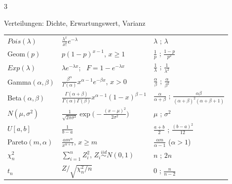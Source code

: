 \documentclass[8pt,a4paper,landscape]{extarticle}
\newcommand{\iid}{\overset{iid}{\sim}}
\begin{document}
\begin{multicols*}{3}
\begin{werkzeug}{Verteilungen: Dichte, Erwartungswert, Varianz}
{\begin{tabularx}{\linewidth}{@{}>{\raggedright\arraybackslash}p{1.75cm}>{\raggedright\arraybackslash}X>{\raggedright\arraybackslash}p{2.75cm}@{}}
$Pois(\lambda)$ & $\frac{\lambda^x}{x!}e^{-\lambda}$ & $\lambda$ ; $\lambda$ \\
Geom$(p)$ & $p(1-p)^{x-1}$, $x\ge 1$ & $\frac1p$ ; $\frac{1-p}{p^2}$ \\
$Exp(\lambda)$ & $\lambda e^{-\lambda x}$; \ $F=1-e^{-\lambda x}$ & $\frac1\lambda$ ; $\frac{1}{\lambda^2}$ \\
Gamma$(\alpha,\beta)$ & $\frac{\beta^\alpha}{\Gamma(\alpha)}x^{\alpha-1}e^{-\beta x}$, $x>0$ & $\frac\alpha\beta$ ; $\frac{\alpha}{\beta^2}$ \\
Beta$(\alpha,\beta)$ & $\frac{\Gamma(\alpha+\beta)}{\Gamma(\alpha)\Gamma(\beta)}x^{\alpha-1}(1-x)^{\beta-1}$ & $\frac{\alpha}{\alpha+\beta}$ ; $\frac{\alpha\beta}{(\alpha+\beta)^2(\alpha+\beta+1)}$ \\
$N(\mu,\sigma^2)$ & $\frac{1}{\sqrt{2\pi\sigma^2}}\exp\!\big(-\frac{(x-\mu)^2}{2\sigma^2}\big)$ & $\mu$ ; $\sigma^2$ \\
$U[a,b]$ & $\frac{1}{b-a}$ & $\frac{a+b}{2}$ ; $\frac{(b-a)^2}{12}$ \\
Pareto$(m,\alpha)$ & $\frac{\alpha m^\alpha}{x^{\alpha+1}}$, $x\ge m$ & $\frac{\alpha m}{\alpha-1}$ ($\alpha>1$) \\
$\chi^2_n$ & $\sum_{i=1}^n Z_i^2$, $Z_i\iid N(0,1)$ & $n$ ; $2n$ \\
$t_n$ & $Z/\sqrt{\chi^2_n/n}$ & $0$ ; $\frac{n}{n-2}$ \\
\bottomrule
\end{tabularx}}
\end{werkzeug}



\end{multicols*}
\end{document}
